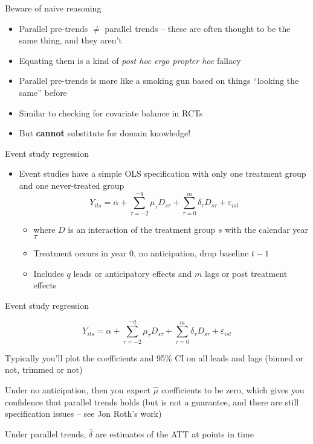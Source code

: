 \documentclass{beamer}
\begin{document}
\begin{frame}{Beware of naive reasoning}

\begin{itemize}
\item Parallel pre-trends $\neq$ parallel trends -- these are often thought to be the same thing, and they aren't
\item Equating them is a kind of \emph{post hoc ergo propter hoc} fallacy
\item Parallel pre-trends is more like a smoking gun based on things ``looking the same'' before
\item Similar to checking for covariate balance in RCTs
\item But \textbf{cannot} substitute for domain knowledge!
\end{itemize}

\end{frame}


\begin{frame}{Event study regression}
	
	\begin{itemize}
	\item Event studies have a simple OLS specification with only one treatment group and one never-treated group $$Y_{its} = \alpha +  \sum_{\tau=-2}^{-q}\mu_{\tau}D_{s\tau} + \sum_{\tau=0}^m\delta_{\tau}D_{s\tau}+\varepsilon_{ist}$$
		\begin{itemize}
		\item where $D$ is an interaction of the treatment group $s$ with the calendar year $\tau$
		\item Treatment occurs in year 0, no anticipation, drop baseline $t-1$
		\item Includes $q$ leads or anticipatory effects and $m$ lags or post treatment effects
		\end{itemize}
	\end{itemize}
\end{frame}

\begin{frame}{Event study regression}


$$Y_{its} = \alpha + \sum_{\tau=-2}^{-q}\mu_{\tau}D_{s\tau} + \sum_{\tau=0}^m\delta_{\tau}D_{s\tau}+\varepsilon_{ist}$$

\bigskip

Typically you'll plot the coefficients and 95\% CI on all leads and lags (binned or not, trimmed or not) 

\bigskip

Under no anticipation, then you expect $\widehat{\mu}$ coefficients to be zero, which gives you confidence that parallel trends holds (but is not a guarantee, and there are still specification issues -- see Jon Roth's work)

\bigskip

Under parallel trends, $\widehat{\delta}$ are estimates of the ATT at points in time

\end{frame}
\end{document}
